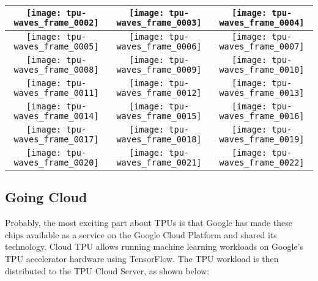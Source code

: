 \begin{figure*}[tph]
\begin{tabular}{|c|c|c|}
\hline
\texttt{[image: tpu-waves\_frame\_0002]}&
\texttt{[image: tpu-waves\_frame\_0003]}&
\texttt{[image: tpu-waves\_frame\_0004]}\\\hline\hline
\texttt{[image: tpu-waves\_frame\_0005]}&
\texttt{[image: tpu-waves\_frame\_0006]}&
\texttt{[image: tpu-waves\_frame\_0007]}\\\hline\hline
\texttt{[image: tpu-waves\_frame\_0008]}&
\texttt{[image: tpu-waves\_frame\_0009]}&
\texttt{[image: tpu-waves\_frame\_0010]}\\\hline\hline
\texttt{[image: tpu-waves\_frame\_0011]}&
\texttt{[image: tpu-waves\_frame\_0012]}&
\texttt{[image: tpu-waves\_frame\_0013]}\\\hline\hline
\texttt{[image: tpu-waves\_frame\_0014]}&
\texttt{[image: tpu-waves\_frame\_0015]}&
\texttt{[image: tpu-waves\_frame\_0016]}\\\hline\hline
\texttt{[image: tpu-waves\_frame\_0017]}&
\texttt{[image: tpu-waves\_frame\_0018]}&
\texttt{[image: tpu-waves\_frame\_0019]}\\\hline\hline
\texttt{[image: tpu-waves\_frame\_0020]}&
\texttt{[image: tpu-waves\_frame\_0021]}&
\texttt{[image: tpu-waves\_frame\_0022]}\\\hline
\end{tabular}
\end{figure*}






\subsection{Going Cloud}

Probably, the most exciting part about TPUs is that Google has made these chips available as a service on the Google Cloud Platform and shared its technology. Cloud TPU allows running machine learning workloads on Google’s TPU accelerator hardware using TensorFlow. The TPU workload is then distributed to the TPU Cloud Server, as shown below:


